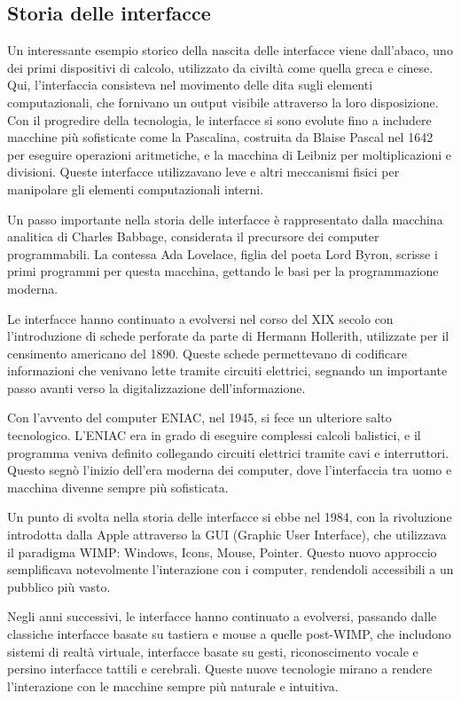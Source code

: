 \subsection{Storia delle interfacce}
Un interessante esempio storico della nascita delle interfacce viene dall’abaco, uno dei primi dispositivi di calcolo, utilizzato da civiltà come quella greca e cinese. Qui, l’interfaccia consisteva nel movimento delle dita sugli elementi computazionali, che fornivano un output visibile attraverso la loro disposizione. Con il progredire della tecnologia, le interfacce si sono evolute fino a includere macchine più sofisticate come la Pascalina, costruita da Blaise Pascal nel 1642 per eseguire operazioni aritmetiche, e la macchina di Leibniz per moltiplicazioni e divisioni. Queste interfacce utilizzavano leve e altri meccanismi fisici per manipolare gli elementi computazionali interni.

Un passo importante nella storia delle interfacce è rappresentato dalla macchina analitica di Charles Babbage, considerata il precursore dei computer programmabili. La contessa Ada Lovelace, figlia del poeta Lord Byron, scrisse i primi programmi per questa macchina, gettando le basi per la programmazione moderna.

Le interfacce hanno continuato a evolversi nel corso del XIX secolo con l'introduzione di schede perforate da parte di Hermann Hollerith, utilizzate per il censimento americano del 1890. Queste schede permettevano di codificare informazioni che venivano lette tramite circuiti elettrici, segnando un importante passo avanti verso la digitalizzazione dell'informazione.

Con l'avvento del computer ENIAC, nel 1945, si fece un ulteriore salto tecnologico. L'ENIAC era in grado di eseguire complessi calcoli balistici, e il programma veniva definito collegando circuiti elettrici tramite cavi e interruttori. Questo segnò l'inizio dell’era moderna dei computer, dove l’interfaccia tra uomo e macchina divenne sempre più sofisticata.

Un punto di svolta nella storia delle interfacce si ebbe nel 1984, con la rivoluzione introdotta dalla Apple attraverso la GUI (Graphic User Interface), che utilizzava il paradigma WIMP: Windows, Icons, Mouse, Pointer. Questo nuovo approccio semplificava notevolmente l'interazione con i computer, rendendoli accessibili a un pubblico più vasto.

Negli anni successivi, le interfacce hanno continuato a evolversi, passando dalle classiche interfacce basate su tastiera e mouse a quelle post-WIMP, che includono sistemi di realtà virtuale, interfacce basate su gesti, riconoscimento vocale e persino interfacce tattili e cerebrali. Queste nuove tecnologie mirano a rendere l'interazione con le macchine sempre più naturale e intuitiva.

